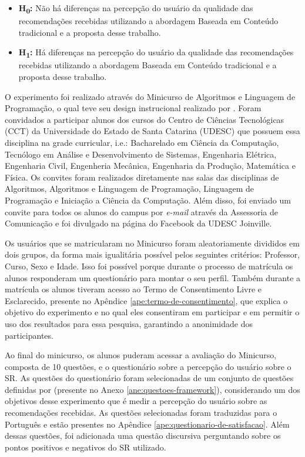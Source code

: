 \begin{itemize}
\item \textbf{H\textsubscript{0}:} Não há diferenças na percepção do usuário da qualidade das recomendações recebidas utilizando a abordagem
Baseada em Conteúdo tradicional e a proposta desse trabalho.
\item \textbf{H\textsubscript{1}:} Há diferenças na percepção do usuário da qualidade das recomendações recebidas utilizando a abordagem
Baseada em Conteúdo tradicional e a proposta desse trabalho.
\end{itemize}

O experimento foi realizado através do Minicurso de Algoritmos e Linguagem de Programação, o qual teve seu design
instrucional realizado por . Foram convidados a participar alunos dos cursos do
Centro de Ciências Tecnológicas (CCT) da Universidade do Estado de Santa Catarina (UDESC) que possuem essa disciplina na
grade curricular, i.e.: Bacharelado em Ciência da Computação, Tecnólogo em Análise e Desenvolvimento de Sistemas, Engenharia
Elétrica, Engenharia Civil, Engenheria Mecânica, Engenharia da Produção, Matemática e Física. Os convites foram
realizados diretamente nas salas das disciplinas de Algoritmos, Algoritmos e Linguagem de Programação, Linguagem de
Programação e Iniciação a Ciência da Computação. Além disso, foi enviado um convite para todos os alunos do campus por
\textit{e-mail} através da Assessoria de Comunicação e foi divulgado na página do Facebook da UDESC Joinville.

Os usuários que se matricularam no Minicurso foram aleatoriamente divididos em dois grupos, da forma mais igualitária possível
pelos seguintes critérios: Professor, Curso, Sexo e Idade. Isso foi possível
porque durante o processo de matrícula os alunos responderam um questionário para montar o seu perfil. Também durante a
matrícula os alunos tiveram acesso ao Termo de Consentimento Livre e Esclarecido, presente no Apêndice
\ref{ape:termo-de-consentimento}, que explica o objetivo do experimento e no qual eles consentiram em participar e em
permitir o uso dos resultados para essa pesquisa, garantindo a anonimidade dos participantes.

Ao final do minicurso, os alunos puderam acessar a avaliação do Minicurso, composta de 10 questões, e o questionário
sobre a percepção do usuário sobre o SR. As questões do questionário foram selecionadas de um
conjunto de questões definidas por  (presente no Anexo \ref{ane:questoes-framework}), considerando
um dos objetivos desse experimento que é medir a percepção do usuário sobre as recomendações recebidas.
As questões selecionadas foram traduzidas para o Português e estão presentes no Apêndice \ref{ape:questionario-de-satisfacao}.
Além dessas questões, foi adicionada uma questão discursiva perguntando sobre os pontos positivos e negativos do SR utilizado.

